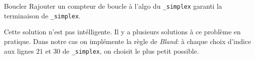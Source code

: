 \documentclass[aspectratio = 169]{beamer}
\begin{document}


\begin{frame}{Boucler}
  Rajouter un compteur de boucle à l'algo du
  \texttt{_simplex} garanti la terminaison de
  \texttt{_simplex}.
  \pause
  \begin{rem}
    Cette solution n'est pas intélligente. Il y a plusieurs solutions
    à ce problème en pratique. Dans notre cas on implémente la règle
    de \emph{Bland}: à chaque choix d'indice aux lignes $21$ et $30$
    de \texttt{_simplex}, on choisit le plus petit
    possible.
  \end{rem}
\end{frame}
\end{document}
